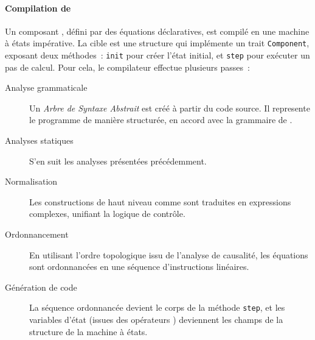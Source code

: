 \paragraph{Compilation de \GRSync} Un composant \GRSync, défini par des équations déclaratives, est
compilé en une machine à états impérative. La cible est une structure \Rust qui implémente un trait
\texttt{Component}, exposant deux méthodes~: \texttt{init} pour créer l'état initial, et
\texttt{step} pour exécuter un pas de calcul. Pour cela, le compilateur effectue plusieurs passes~:
\begin{description}
      \item[Analyse grammaticale] Un \emph{Arbre de Syntaxe Abstrait} est créé à partir du code
            source. Il represente le programme de manière structurée, en accord avec la grammaire de
            \GRust.
      \item[Analyses statiques] S'en suit les analyses présentées précédemment.
      \item[Normalisation] Les constructions de haut niveau comme  sont traduites en
            expressions  complexes, unifiant la logique de contrôle.
      \item[Ordonnancement] En utilisant l'ordre topologique issu de l'analyse de causalité, les
            équations sont ordonnancées en une séquence d'instructions linéaires.
      \item[Génération de code] La séquence ordonnancée devient le corps de la méthode
            \texttt{step}, et les variables d'état (issues des opérateurs ) deviennent
            les champs de la structure de la machine à états.
\end{description}

